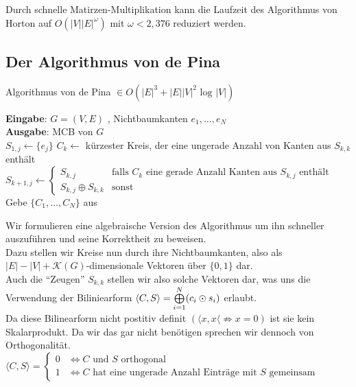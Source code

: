 \documentclass[a4paper,10pt]{scrartcl}
\newcommand{\tbf}{\textbf}
\newcommand{\Ra}{\Rightarrow}
\newcommand{\agn}{\leftarrow}
\newcommand{\Gr}{$G = (V,E)$ }
\newcommand{\Lra}{\Leftrightarrow}
\newcommand{\calK}{\mathcal{K}}
\newcommand{\Eingabe}[1]{\STATE \tbf{Eingabe}: #1 \\}
\newcommand{\Ausgabe}[1]{\STATE \tbf{Ausgabe}: #1 \\}
\begin{document}
Durch schnelle Matirzen-Multiplikation kann die Laufzeit des Algorithmus von \textsf{Horton} auf $O(|V| |E|^\omega)$ mit $\omega < 2,376$ reduziert werden. \\

\subsection{Der Algorithmus von \textsf{de Pina}}
\begin{algorithm}
\caption{Algorithmus von \textsf{de Pina} $\in O(|E|^3 + |E||V|^2 \text{ log } |V|)$}
\begin{algorithmic}
\Eingabe{\Gr, Nichtbaumkanten $e_1, \ldots, e_N$}
\Ausgabe{MCB von $G$}
	\STATE $S_{1,j} \agn \{e_j\}$
\ENDFOR
{}
	\STATE $C_k \agn$ kürzester Kreis, der eine ungerade Anzahl von Kanten aus $S_{k,k}$ enthält
		\STATE $S_{k+1,j} \agn \begin{cases} S_{k,j} & \text{falls } C_k \text{ eine gerade Anzahl Kanten aus } S_{k,j} \text{ enthält} \\ S_{k,j} \oplus S_{k,k} & \text{sonst} \end{cases}$
	\ENDFOR
\ENDFOR
\STATE Gebe $\{C_1, \ldots, C_N\}$ aus
\end{algorithmic}
\end{algorithm}

Wir formulieren eine algebraische Version des Algorithmus um ihn schneller auszuführen und seine Korrektheit zu beweisen. \\

Dazu stellen wir Kreise nun durch ihre Nichtbaumkanten, also als $|E| - |V| + \calK(G)$-dimensionale Vektoren über $\{0,1\}$ dar. \\

Auch die ``Zeugen'' $S_{k,k}$ stellen wir also solche Vektoren dar, was uns die Verwendung der Biliniearform $\langle C,S \rangle = \bigoplus_{i=1}^N \limits (c_i \odot s_i)$ erlaubt. \\

Da diese Bilinearform nicht postitiv definit $(\langle x,x \langle \not \Ra x = 0)$ ist sie kein Skalarprodukt. Da wir das gar nicht benötigen sprechen wir dennoch von Orthogonalität. \\

$\langle C,S \rangle = \begin{cases} 0 & \Lra C \text{ und } S \text{ orthogonal} \\ 1 & \Lra C \text{ hat eine ungerade Anzahl Einträge mit } S \text{ gemeinsam} \end{cases}$ 
\end{document}
